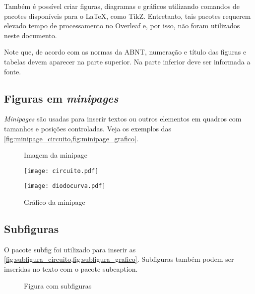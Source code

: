 Também é possível criar figuras, diagramas e gráficos utilizando comandos de pacotes disponíveis para o \LaTeX, como \textsf{TikZ}. Entretanto, tais pacotes requerem elevado tempo de processamento no Overleaf e, por isso, não foram utilizados neste documento.

Note que, de acordo com as normas da ABNT, numeração e título das figuras e tabelas devem aparecer na parte superior. Na parte inferior deve ser informada a fonte.

\subsection{Figuras em \emph{minipages}}

\emph{Minipages} são usadas para inserir textos ou outros elementos em quadros com tamanhos e posições controladas. Veja os exemplos das \cref{fig:minipage_circuito,fig:minipage_grafico}.

\begin{figure}[htb]
    \label{fig:teste}
    \centering
    \begin{minipage}[t]{0.46\textwidth}
        \centering
        \caption{Imagem da minipage}
        \label{fig:minipage_circuito}
        \texttt{[image: circuito.pdf]} 
    \end{minipage}
    \hfill
    \begin{minipage}[t]{0.52\textwidth}
        \centering
        \caption{Gráfico da minipage}
        \label{fig:minipage_grafico}
        \texttt{[image: diodocurva.pdf]}
    \end{minipage}
\end{figure}

\subsection{Subfiguras}

O pacote \textsf{subfig} foi utilizado para inserir as \cref{fig:subfigura_circuito,fig:subfigura_grafico}. Subfiguras também podem ser inseridas no texto com o pacote \textsf{subcaption}.

\begin{figure}[htb]
    \centering
    \caption{Figura com subfiguras}
    \label{fig:subfiguras}
\end{figure}

